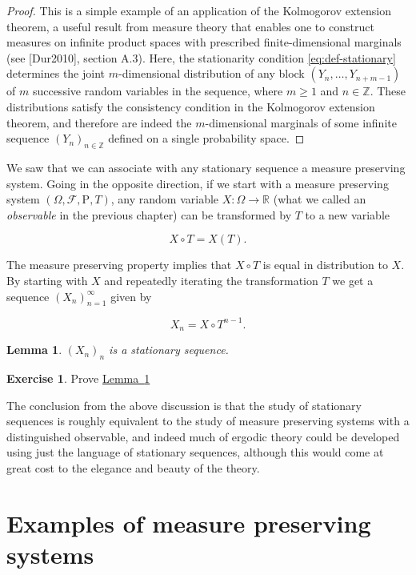 \documentclass[11pt]{report}
\newcommand{\R}{\mathbb{R}}
\newcommand{\Z}{\mathbb{Z}}
\theoremstyle{plain}
\newtheorem{lem}[thm]{Lemma}
\theoremstyle{definition}
\newtheorem{xexercise}[thm]{Exercise}
\begin{document}
\begin{proof}
This is a simple example of an application of the
Kolmogorov extension theorem, a useful result from
measure theory that enables one to construct measures
on infinite product spaces with prescribed
finite-dimensional marginals (see [Dur2010], section
A.3). Here, the stationarity condition
\eqref{eq:def-stationary} determines the joint
$m$-dimensional distribution of any block
$(Y_n,\ldots,Y_{n+m-1})$ of $m$ successive random
variables in the sequence, where $m\ge1$ and $n\in\Z$.
These distributions satisfy the consistency condition
in the Kolmogorov extension theorem, and therefore are
indeed the $m$-dimensional marginals of some infinite
sequence $(Y_n)_{n\in\Z}$ defined on a single
probability space.
\end{proof}

\noindent We saw that we can associate with any stationary
sequence a measure preserving system. Going in the
opposite direction, if we start with a measure
preserving system
$(\Omega, \mathcal{F}, \mathrm{P}, T)$, any random
variable $X:\Omega\to\R$ (what we called an
\emph{observable} in the previous chapter) can be
transformed by $T$ to a new variable

\[
X\circ T = X(T).
\]

\noindent The measure preserving property implies that
$X\circ T$ is equal in distribution to $X$. By
starting with $X$ and repeatedly iterating the
transformation $T$ we get a sequence
$(X_n)_{n=1}^\infty$ given by

\[
X_n = X\circ T^{n-1}.
\]

\begin{lem}
\label{lem-mps-stationary}
$(X_n)_n$ is a stationary sequence.
\end{lem}

\begin{xexercise}
Prove \hyperref[lem-mps-stationary]{Lemma~\ref*{lem-mps-stationary}}
\end{xexercise}

\noindent The conclusion from the above discussion is that the
study of stationary sequences is roughly equivalent to
the study of measure preserving systems with a
distinguished observable, and indeed much of ergodic
theory could be developed using just the language of
stationary sequences, although this would come at
great cost to the elegance and beauty of the theory.

\section{Examples of measure preserving systems}
\end{document}
